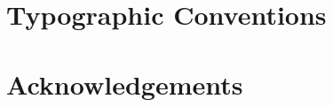 \section{Typographic Conventions}\label{sec:preface:typographic-conventions}



\section{Acknowledgements}\label{sec:preface:acknowledgements}




%
%
%
%
%
%
%
%




